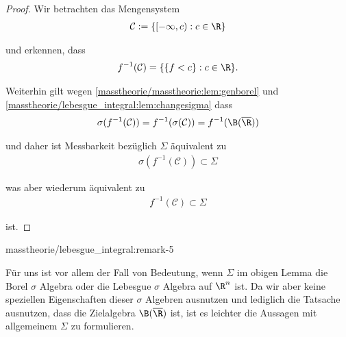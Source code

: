 \documentclass[letterpaper,10pt,german]{jupyterBook}
\begin{document}
\begin{proof}
 Wir betrachten das Mengensystem
\begin{align*}
\mathcal{C}:=\{[-\infty,c):c\in\R\}
\end{align*}
\par
und erkennen, dass
\begin{align*}
f^{-1}(\mathcal{C}) = \{\{f<c\}:c\in\R\}.
\end{align*}
\par
Weiterhin gilt wegen \cref{masstheorie/masstheorie:lem:genborel} und \cref{masstheorie/lebesgue_integral:lem:changesigma}  dass
\begin{align*}
\sigma(f^{-1}(\mathcal{C})) = f^{-1}(\sigma(\mathcal{C})) = f^{-1}(\B(\overline{\R}))
\end{align*}
\par
und daher ist Messbarkeit bezüglich \(\Sigma\) äquivalent zu
\begin{align*}
\sigma(f^{-1}(\mathcal{C})) \subset \Sigma
\end{align*}
\par
was aber wiederum äquivalent zu
\begin{align*}
f^{-1}(\mathcal{C}) \subset \Sigma
\end{align*}
\par
ist.
\end{proof}
\begin{remark}{}{masstheorie/lebesgue_integral:remark-5}



\par
Für uns ist vor allem der Fall von Bedeutung, wenn \(\Sigma\) im obigen Lemma die Borel \(\sigma\) Algebra oder die Lebesgue \(\sigma\) Algebra auf \(\R^n\) ist. Da wir aber keine speziellen Eigenschaften dieser \(\sigma\) Algebren ausnutzen und lediglich die Tatsache ausnutzen, dass die Zielalgebra \(\B(\overline{\R})\) ist, ist es leichter die Aussagen mit allgemeinem \(\Sigma\) zu formulieren.
\end{remark}
\end{document}
